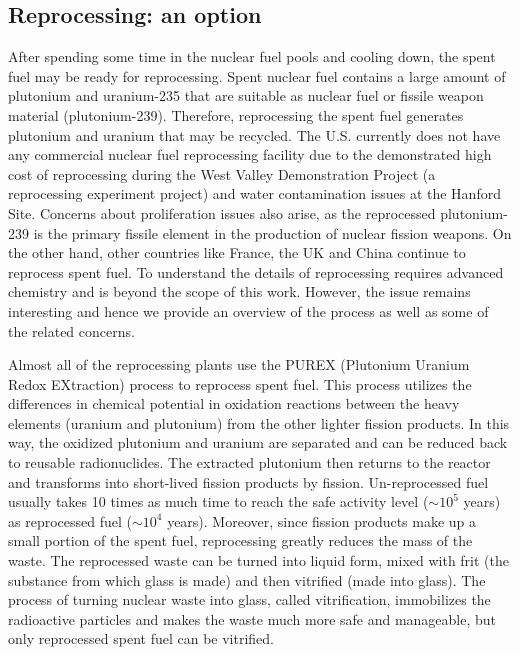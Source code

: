 \documentclass[nofootinbib,preprint,aps]{revtex4-1}
\begin{document}
    \subsection{Reprocessing: an option}
    \label{sec:reproc}
    After spending some time in the nuclear fuel pools and cooling down, the spent fuel may be ready
    for reprocessing.
    Spent nuclear fuel contains a large amount of plutonium and uranium-235 that are suitable as nuclear fuel
    or fissile weapon material (plutonium-239). Therefore, reprocessing the spent fuel generates plutonium and
    uranium that may be recycled. The U.S. currently does not have any commercial nuclear fuel
    reprocessing facility due to the demonstrated high cost of reprocessing
    during the West Valley Demonstration Project (a reprocessing experiment project)
    and water contamination issues at the Hanford Site.
    Concerns about proliferation issues also arise, as the 
    reprocessed plutonium-239 is the primary fissile element in the production of nuclear fission weapons.\cite{aa12}
    On the other hand, other countries like France, the UK and China
    continue to reprocess spent fuel.\cite{v14,h14,h15}
    To understand the details of reprocessing
    requires advanced chemistry and is beyond the scope of this work. However, the issue remains interesting
    and hence we provide an overview of the process as well as some of the related concerns.

    Almost all of the reprocessing plants use the PUREX (Plutonium Uranium Redox EXtraction) process
    to reprocess spent fuel. This process utilizes the differences in chemical potential in oxidation reactions
    between the heavy elements (uranium and plutonium) from the other lighter fission products.
    In this way,
    the oxidized plutonium and uranium are separated and can be reduced back to reusable radionuclides.\cite{lb01} 
    The extracted plutonium then returns to the reactor and transforms into short-lived fission products
    by fission. Un-reprocessed fuel usually takes 10 times as much time to reach the safe
    activity level ($\sim 10^5$ years) as reprocessed fuel ($\sim 10^4$ years). Moreover, since fission products
    make up a small portion of the spent fuel, reprocessing greatly reduces the mass of the waste. The reprocessed
    waste can be turned into liquid form, mixed with frit (the substance from which glass is made) and then
    vitrified (made into glass). The process of turning nuclear waste into glass, called vitrification,
    immobilizes the radioactive particles and makes
    the waste much more safe and manageable, but only reprocessed spent fuel can be vitrified.\cite{v14}
\end{document}
